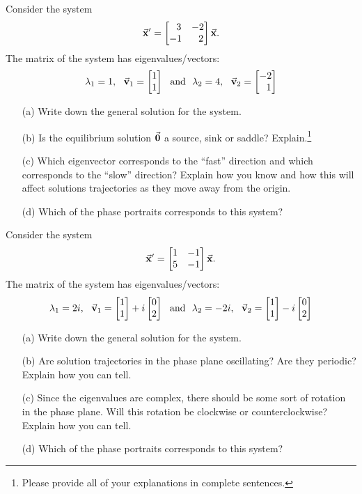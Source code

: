 \documentclass[epsf]{article}
\begin{document}
 Consider the system
$$\vec{\bf x}' = \begin{bmatrix}\ \ 3 & -2 \cr -1 &\ \ 2 \end{bmatrix}\vec{\bf x}.$$
The matrix of the system has eigenvalues/vectors:
$$ \lambda_1 = 1, \ \ \vec{\bf v}_1 = \begin{bmatrix}1\cr 1 \end{bmatrix} \ \ \text{and} \ \ \lambda_2 = 4,\ \ \vec{\bf v}_2= \begin{bmatrix}-2\cr \ \ 1 \end{bmatrix}$$
\begin{itemize}
\item[(a)] Write down the general solution for the system.
\vskip 2mm 
\item[(b)] Is the equilibrium solution $\vec{\bf 0}$ a source, sink or saddle? Explain.\footnote{Please provide all of your explanations in complete sentences.}
\vskip 2mm

\item[(c)] Which eigenvector corresponds to the ``fast'' direction and which corresponds to the ``slow'' direction?  Explain how you know and how this will affect solutions trajectories as they move away from the origin.
\vskip 2mm
\item[(d)] Which of the phase portraits corresponds to this system?
\end{itemize}

\vskip 2mm

 Consider the system
$$\vec{\bf x}' = \begin{bmatrix} 1 & -1 \cr 5 & -1 \end{bmatrix}\vec{\bf x}.$$
The matrix of the system has eigenvalues/vectors:
$$ \lambda_1 = 2i, \ \ \vec{\bf v}_1 = \begin{bmatrix}1\cr 1 \end{bmatrix} + i\begin{bmatrix}0 \cr 2 \end{bmatrix}\ \ \text{and} \ \ \lambda_2 = -2i,\ \ \vec{\bf v}_2= \begin{bmatrix}1\cr 1 \end{bmatrix} - i\begin{bmatrix}0 \cr 2 \end{bmatrix}$$

\begin{itemize}
\item[(a)] Write down the general solution for the system.
\vskip 2mm
\item[(b)] Are solution trajectories in the phase plane oscillating?  Are they periodic? Explain how you can tell.
\newpage

\item[(c)] Since the eigenvalues are complex, there should be some sort of rotation in the phase plane.  Will this rotation be clockwise or counterclockwise?  Explain how you can tell.
\vskip 2mm
\item[(d)] Which of the phase portraits corresponds to this system?
\end{itemize}
\end{document}
